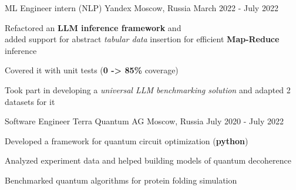 
\begin{cventries}
  \cventry
    {ML Engineer intern (NLP)}
    {Yandex}
    {Moscow, Russia}
    {March 2022 - July 2022}
    {
      \begin{cvitems} %
        \item {Refactored an \textbf{LLM inference framework} 
        and \\added support for abstract \textit{tabular data} insertion for efficient \textbf{Map-Reduce} inference}
        \item {Covered it with unit tests (\textbf{0 -> 85\%} coverage)}
        \item {Took part in developing a \textit{universal LLM benchmarking solution} and adapted 2 datasets for it}
      \end{cvitems}
    }
    
  \cventry
    {Software Engineer} %
    {Terra Quantum AG} %
    {Moscow, Russia} %
    {July 2020 - July 2022} %
    {
      \begin{cvitems} %
        \item {Developed a framework for quantum circuit optimization (\textbf{python})}
        \item {Analyzed experiment data and helped building models of quantum decoherence}
        \item {Benchmarked quantum algorithms for protein folding simulation}
      \end{cvitems}
    }
    
\end{cventries}
